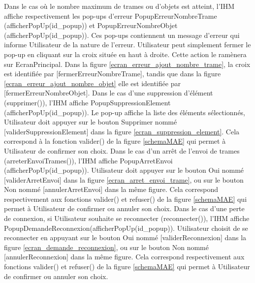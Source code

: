 \newline
\newline
Dans le cas où le nombre maximum de trames ou d'objets est atteint, l'IHM affiche respectivement les pop-ups d'erreur PopupErreurNombreTrame (afficherPopUp(id\_popup)) et PopupErreurNombreObjet (afficherPopUp(id\_popup)). Ces pop-ups contiennent un message d'erreur qui informe Utilisateur de la nature de l'erreur. Utilisateur peut simplement fermer le pop-up en cliquant sur la croix située en haut à droite. Cette action le ramènera sur EcranPrincipal. Dans la figure \ref{ecran_erreur_ajout_nombre_trame}, la croix est identifiée par [fermerErreurNombreTrame], tandis que dans la figure \ref{ecran_erreur_ajout_nombre_objet} elle est identifiée par [fermerErreurNombreObjet].
\newpage
Dans le cas d'une suppression d'élément (supprimer()), l'IHM affiche PopupSuppressionElement (afficherPopUp(id\_popup)). Le pop-up affiche la liste des éléments sélectionnés, Utilisateur doit appuyer sur le bouton {\guillemetleft} Supprimer {\guillemetright} nommé [validerSuppressionElement] dans la figure \ref{ecran_suppression_element}. Cela correspond à la fonction {\guillemetleft} valider() {\guillemetright} de la figure \ref{schemaMAE} qui permet à Utilisateur de confirmer son choix.
\newline
\newline
Dans le cas d'un arrêt de l'envoi de trames (arreterEnvoiTrames()), l'IHM affiche PopupArretEnvoi (afficherPopUp(id\_popup)). Utilisateur doit appuyer sur le bouton {\guillemetleft} Oui {\guillemetright} nommé [validerArretEnvoi] dans la figure \ref{ecran_arret_envoi_trame}, ou sur le bouton {\guillemetleft} Non {\guillemetright} nommé [annulerArretEnvoi] dans la même figure. Cela correspond respectivement aux fonctions {\guillemetleft} valider() {\guillemetright} et {\guillemetleft} refuser() {\guillemetright} de la figure \ref{schemaMAE} qui permet à Utilisateur de confirmer ou annuler son choix.
\newline
\newline
Dans le cas d'une perte de connexion, si Utilisateur souhaite se reconnecter (reconnecter()), l'IHM affiche PopupDemandeReconnexion(afficherPopUp(id\_popup)). Utilisateur choisit de se reconnecter en appuyant sur le bouton {\guillemetleft} Oui {\guillemetright} nommé [validerReconnexion] dans la figure \ref{ecran_demande_reconnexion}, ou sur le bouton {\guillemetleft} Non {\guillemetright} nommé [annulerReconnexion] dans la même figure. Cela correspond respectivement aux fonctions {\guillemetleft} valider() {\guillemetright} et {\guillemetleft} refuser() {\guillemetright} de la figure \ref{schemaMAE} qui permet à Utilisateur de confirmer ou annuler son choix.

